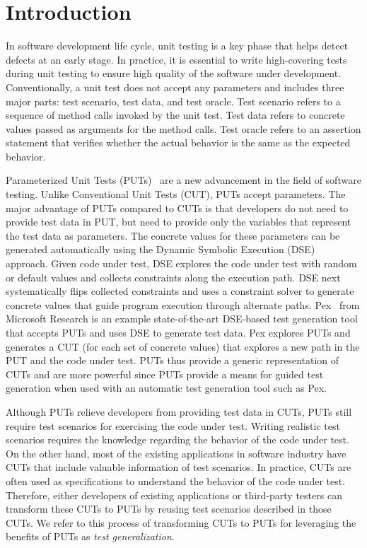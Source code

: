 \section{Introduction}
\label{sec:intro}

In software development life cycle, unit testing is a key phase that helps detect defects at an early stage. In practice, it is essential to write high-covering tests during unit testing to ensure high quality of the software under development. Conventionally, a unit test does not accept any parameters and includes three major parts: test scenario, test data, and test oracle. Test scenario refers to a sequence of method calls invoked by the unit test. Test data refers to concrete values passed as arguments for the method calls. Test oracle refers to an assertion statement that verifies whether the actual behavior is the same as the expected behavior. 

Parameterized Unit Tests (PUTs)~\cite{tillmann05:parameterized} are a new advancement in the field of software testing. Unlike Conventional Unit Tests (CUT), PUTs accept parameters. The major advantage of PUTs compared to CUTs is that developers do not need to provide test data in PUT, but need to provide only the variables that represent the test data as parameters. The concrete values for these parameters can be generated automatically using the Dynamic Symbolic Execution (DSE)~\cite{king:symex, godefroid05:dart, sen07:cute} approach. Given code under test, DSE explores the code under test with random or default values and collects constraints along the execution path. DSE next systematically flips collected constraints and uses a constraint solver to generate concrete values that guide program execution through alternate paths. Pex~\cite{tillmann08:pex, pex:rel} from Microsoft Research is an example state-of-the-art DSE-based test generation tool that accepts PUTs and uses DSE to generate test data. Pex explores PUTs and generates a CUT (for each set of concrete values) that explores a new path in the PUT and the code under test. PUTs thus provide a generic representation of CUTs and are more powerful since PUTs provide a means for guided test generation when used with an automatic test generation tool such as Pex. 

Although PUTs relieve developers from providing test data in CUTs, PUTs still require test scenarios for exercising the code under test. Writing realistic test scenarios requires the knowledge regarding the behavior of the code under test. On the other hand, most of the existing applications in software industry have CUTs that include valuable information of test scenarios. In practice, CUTs are often used as specifications to understand the behavior of the code under test. Therefore, either developers of existing applications or third-party testers can transform these CUTs to PUTs by reusing test scenarios described in those CUTs. We refer to this process of transforming CUTs to PUTs for leveraging the benefits of PUTs as \emph{test generalization}. %

